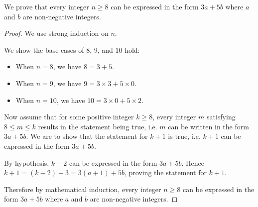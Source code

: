 \begin{example}
    We prove that every integer $n \geq 8$ can be expressed in the form $3a + 5b$ where $a$ and $b$ are non-negative integers.
    \begin{proof}
        We use strong induction on $n$.
        
        We show the base cases of 8, 9, and 10 hold:
        \begin{itemize}
            \item When $n = 8$, we have $8 = 3 + 5$.
            \item When $n = 9$, we have $9 = 3 \times 3 + 5 \times 0$.
            \item When $n = 10$, we have $10 = 3 \times 0 + 5 \times 2$.
        \end{itemize}
        
        Now assume that for some positive integer $k \geq 8$, every integer $m$ satisfying $8 \leq m \leq k$ results in the statement being true, i.e. $m$ can be written in the form $3a + 5b$. We are to show that the statement for $k+1$ is true, i.e. $k+1$ can be expressed in the form $3a + 5b$.
        
        By hypothesis, $k - 2$ can be expressed in the form $3a+5b$. Hence $k+1 = (k-2) + 3 = 3(a+1) + 5b$, proving the statement for $k+1$.
        
        Therefore by mathematical induction, every integer $n \geq 8$ can be expressed in the form $3a + 5b$ where $a$ and $b$ are non-negative integers.
    \end{proof}
\end{example}

